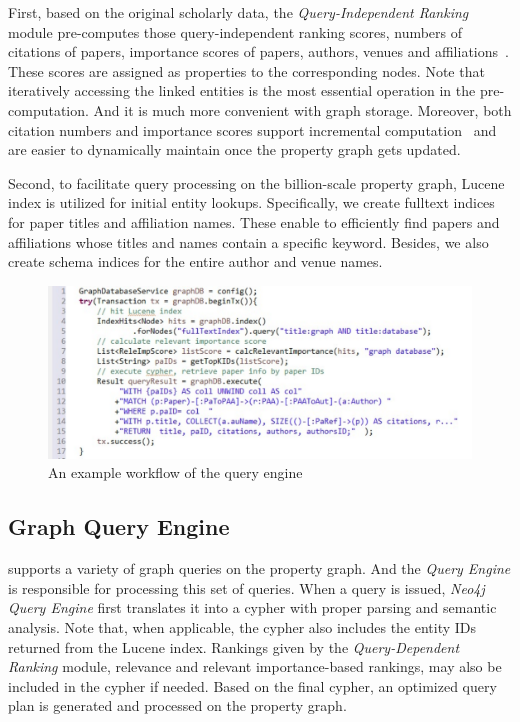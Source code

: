 First, based on the original scholarly data, the {\em Query-Independent Ranking} module pre-computes those query-independent ranking scores, \ie numbers of citations of papers, importance scores of papers, authors, venues and affiliations~\cite{ma2018query}. These scores are assigned as properties to the corresponding nodes.
Note that iteratively accessing the linked entities is the most essential operation in the pre-computation. And it is much more convenient with graph storage.
Moreover, both citation numbers and importance scores support incremental computation~\cite{ma2018query} and are easier to dynamically maintain once the property graph gets updated.


Second, to facilitate query processing on the billion-scale property graph, Lucene index is utilized for initial entity lookups. Specifically, we create fulltext indices for paper titles and affiliation names. These enable to efficiently find papers and affiliations whose titles and names contain a specific keyword. Besides, we also create schema indices for the entire author and venue names. %


\begin{figure}
\centering
\includegraphics[width=\columnwidth]{queryProcess.pdf}
\vspace{-3ex}
\caption{An example workflow of the query engine}
\label{fig:queryProcess}
\end{figure}

\subsection{Graph Query Engine} \label{subsec:qe}
\oursystem supports a variety of graph queries on the property graph. And the {\em Query Engine} is responsible for processing this set of queries. When a query is issued, {\em Neo4j Query Engine} first translates it into a cypher with proper parsing and semantic analysis.
Note that, when applicable, the cypher also includes the entity IDs returned from the Lucene index. Rankings given by the {\em Query-Dependent Ranking} module, \ie relevance and relevant importance-based rankings, may also be included in the cypher if needed. Based on the final cypher, an optimized query plan is generated and processed on the property graph.


